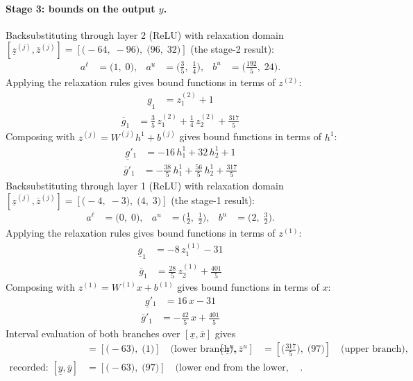 \documentclass[11pt]{article}
\begin{document}
\paragraph{Stage 3: bounds on the output $y$.}
Backsubstituting through layer 2 (ReLU) with relaxation domain $[\underline{z}^{(j)}, \overline{z}^{(j)}] = [\bigl(-64,\; -96\bigr),\; \bigl(96,\; 32\bigr)]$ (the stage-2 result):
\begin{align*}
a^{\ell} &= \bigl(1,\; 0\bigr), & a^{u} &= \bigl(\frac{3}{5},\; \frac{1}{4}\bigr), & b^{u} &= \bigl(\frac{192}{5},\; 24\bigr).
\end{align*}
Applying the relaxation rules gives bound functions in terms of $z^{(2)}$:
\begin{align*}
\underline{g}_{1} &= z^{(2)}_{1} + 1
\end{align*}
\begin{align*}
\overline{g}_{1} &= \frac{3}{5}\,z^{(2)}_{1} + \frac{1}{4}\,z^{(2)}_{2} + \frac{317}{5}
\end{align*}
Composing with $z^{(j)} = W^{(j)} h^{1} + b^{(j)}$ gives bound functions in terms of $h^{1}$:
\begin{align*}
\underline{g}'_{1} &= -16\,h^{1}_{1} + 32\,h^{1}_{2} + 1
\end{align*}
\begin{align*}
\overline{g}'_{1} &= -\frac{38}{5}\,h^{1}_{1} + \frac{56}{5}\,h^{1}_{2} + \frac{317}{5}
\end{align*}
Backsubstituting through layer 1 (ReLU) with relaxation domain $[\underline{z}^{(j)}, \overline{z}^{(j)}] = [\bigl(-4,\; -3\bigr),\; \bigl(4,\; 3\bigr)]$ (the stage-1 result):
\begin{align*}
a^{\ell} &= \bigl(0,\; 0\bigr), & a^{u} &= \bigl(\frac{1}{2},\; \frac{1}{2}\bigr), & b^{u} &= \bigl(2,\; \frac{3}{2}\bigr).
\end{align*}
Applying the relaxation rules gives bound functions in terms of $z^{(1)}$:
\begin{align*}
\underline{g}_{1} &= -8\,z^{(1)}_{1} - 31
\end{align*}
\begin{align*}
\overline{g}_{1} &= \frac{28}{5}\,z^{(1)}_{2} + \frac{401}{5}
\end{align*}
Composing with $z^{(1)} = W^{(1)} x + b^{(1)}$ gives bound functions in terms of $x$:
\begin{align*}
\underline{g}'_{1} &= 16\,x - 31
\end{align*}
\begin{align*}
\overline{g}'_{1} &= -\frac{42}{5}\,x + \frac{401}{5}
\end{align*}
Interval evaluation of both branches over $[\underline{x}, \overline{x}]$ gives
\begin{align*}
[\underline{z}^{\ell}, \overline{z}^{\ell}] &= [\bigl(-63\bigr),\; \bigl(1\bigr)] \quad\text{(lower branch)}, & [\underline{z}^{u}, \overline{z}^{u}] &= [\bigl(\frac{317}{5}\bigr),\; \bigl(97\bigr)] \quad\text{(upper branch)}, \\
\text{recorded: } [\underline{y}, \overline{y}] &= [\bigl(-63\bigr),\; \bigl(97\bigr)] \quad\text{(lower end from the lower, upper end from the upper branch)}.
\end{align*}
\end{document}
